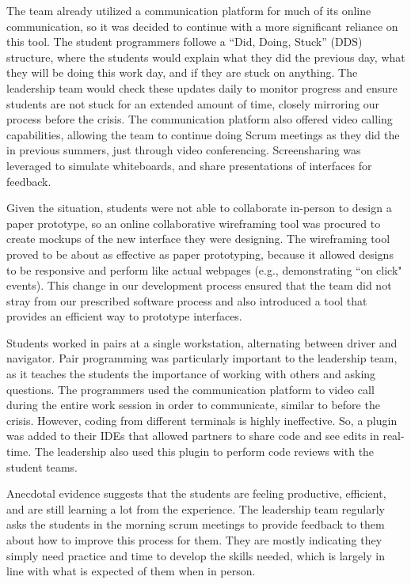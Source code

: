 The team already utilized a communication platform for much of its online communication, so it was decided to continue with a more significant reliance on this tool. The student programmers followe a ``Did, Doing, Stuck'' (DDS) structure, where the students would explain what they did the previous day, what they will be doing this work day, and if they are stuck on anything. The leadership team would check these updates daily to monitor progress and ensure students are not stuck for an extended amount of time, closely mirroring our process before the crisis. The communication platform also offered video calling capabilities, allowing the team to continue doing Scrum meetings as they did the in previous summers, just through video conferencing. Screensharing was leveraged to simulate whiteboards, and share presentations of interfaces for feedback.

Given the situation, students were not able to collaborate in-person to design a paper prototype, so an online collaborative wireframing tool was procured to create mockups of the new interface they were designing. The wireframing tool proved to be about as effective as paper prototyping, because it allowed designs to be responsive and perform like actual webpages (e.g., demonstrating ``on click" events). This change in our development process ensured that the team did not stray from our prescribed software process and also introduced a tool that provides an efficient way to prototype interfaces.

Students worked in pairs at a single workstation, alternating between driver and navigator. Pair programming was particularly important to the leadership team, as it teaches the students the importance of working with others and asking questions. The programmers used the communication platform to video call during the entire work session in order to communicate, similar to before the crisis. However, coding from different terminals is highly ineffective. So, a plugin was added to their IDEs that allowed partners to share code and see edits in real-time. The leadership also used this plugin to perform code reviews with the student teams.

Anecdotal evidence suggests that the students are feeling productive, efficient, and are still learning a lot from the experience. The leadership team regularly asks the students in the morning scrum meetings to provide feedback to them about how to improve this process for them. They are mostly indicating they simply need practice and time to develop the skills needed, which is largely in line with what is expected of them when in person.

